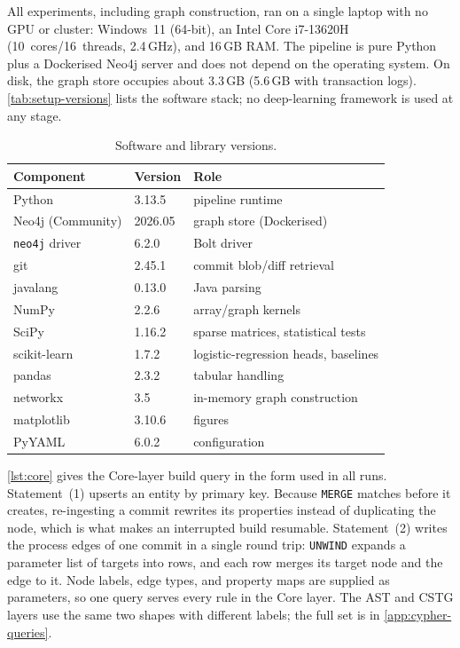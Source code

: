 \documentclass[final,5p,times,twocolumn]{elsarticle}
\theoremstyle{plain}
\begin{document}
All experiments, including graph construction, ran on a single laptop with no GPU or cluster: Windows~11 (64-bit), an Intel Core i7-13620H (10~cores/16~threads, 2.4\,GHz), and 16\,GB RAM. The pipeline is pure Python plus a Dockerised Neo4j server and does not depend on the operating system. On disk, the graph store occupies about 3.3\,GB (5.6\,GB with transaction logs). \autoref{tab:setup-versions} lists the software stack; no deep-learning framework is used at any stage.
\begin{table}[t]
\centering
\caption{Software and library versions.}
\label{tab:setup-versions}
\footnotesize
\setlength{\tabcolsep}{3pt}
\begin{tabularx}{\columnwidth}{llX}
\toprule
Component & Version & Role \\
\midrule
Python & 3.13.5 & pipeline runtime \\
Neo4j (Community) & 2026.05 & graph store (Dockerised) \\
\texttt{neo4j} driver & 6.2.0 & Bolt driver \\
git & 2.45.1 & commit blob/diff retrieval \\
javalang & 0.13.0 & Java parsing \\
NumPy & 2.2.6 & array/graph kernels \\
SciPy & 1.16.2 & sparse matrices, statistical tests \\
scikit-learn & 1.7.2 & logistic-regression heads, baselines \\
pandas & 2.3.2 & tabular handling \\
networkx & 3.5 & in-memory graph construction \\
matplotlib & 3.10.6 & figures \\
PyYAML & 6.0.2 & configuration \\
\bottomrule
\end{tabularx}
\end{table}

\autoref{lst:core} gives the Core-layer build query in the form used in all runs. Statement~(1) upserts an entity by primary key. Because \texttt{MERGE} matches before it creates, re-ingesting a commit rewrites its properties instead of duplicating the node, which is what makes an interrupted build resumable. Statement~(2) writes the process edges of one commit in a single round trip: \texttt{UNWIND} expands a parameter list of targets into rows, and each row merges its target node and the edge to it. Node labels, edge types, and property maps are supplied as parameters, so one query serves every rule in the Core layer. The AST and CSTG layers use the same two shapes with different labels; the full set is in \autoref{app:cypher-queries}.
\end{document}
